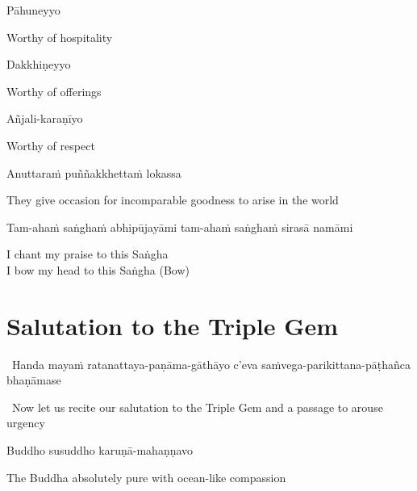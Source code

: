 Pāhuneyyo

\begin{english}
  Worthy of hospitality
\end{english}

Dakkhiṇeyyo

\begin{english}
  Worthy of offerings
\end{english}

Añjali-karaṇīyo

\begin{english}
  Worthy of respect
\end{english}

Anuttaraṁ puññakkhettaṁ lokassa

\begin{english}
  They give occasion for incomparable goodness to arise in the world
\end{english}

\begin{pali-hang}
  Tam-ahaṁ saṅghaṁ abhipūjayāmi tam-ahaṁ saṅghaṁ sirasā namāmi
\end{pali-hang}

\begin{english}
  I chant my praise to this Saṅgha\\
  I bow my head to this Saṅgha \hfill{(Bow)}
\end{english}

\section{Salutation to the Triple Gem}
\label{salutation}

\begin{leader}
  \anglebracketleft\ \hspace{-0.5mm}Handa mayaṁ ratanattaya-paṇāma-gāthāyo c'eva saṁvega-parikittana-pāṭhañca bhaṇāmase \hspace{-0.5mm}\anglebracketright\
\end{leader}
\begin{leader-english-belowpali}
  \anglebracketleft\ \hspace{-0.5mm}Now let us recite our salutation to the Triple Gem and a passage to arouse urgency \hspace{-0.5mm}\anglebracketright\
\end{leader-english-belowpali}

Buddho susuddho karuṇā-mahaṇṇavo

\begin{english}
  The Buddha absolutely pure with ocean-like compassion
\end{english}

